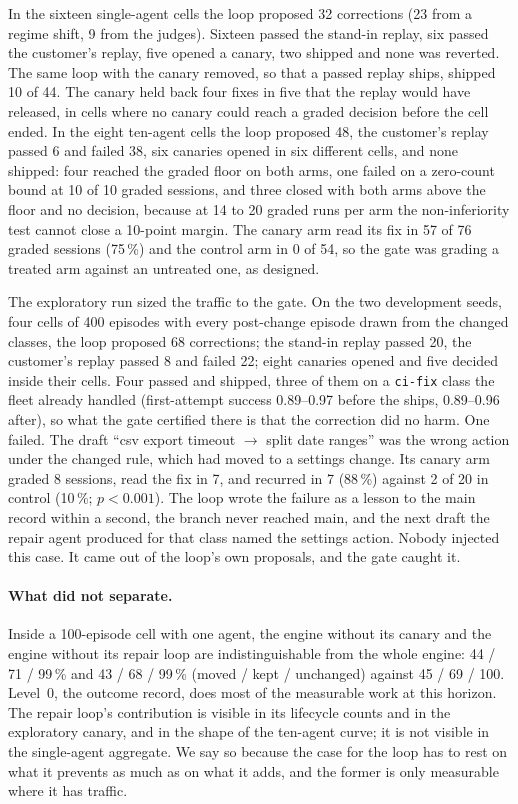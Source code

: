 \documentclass[11pt]{article}
\newcommand{\code}[1]{\texttt{#1}}
\begin{document}
In the sixteen single-agent cells the loop proposed 32 corrections (23 from a regime shift, 9
from the judges). Sixteen passed the stand-in replay, six passed the customer's replay, five
opened a canary, two shipped and none was reverted. The same loop with the canary removed, so
that a passed replay ships, shipped 10 of 44. The canary held back four fixes in five that the
replay would have released, in cells where no canary could reach a graded decision before the
cell ended. In the eight ten-agent cells the loop proposed 48, the customer's replay passed 6
and failed 38, six canaries opened in six different cells, and none shipped: four reached the
graded floor on both arms, one failed on a zero-count bound at 10 of 10 graded sessions, and
three closed with both arms above the floor and no decision, because at 14 to 20 graded runs per
arm the non-inferiority test cannot close a 10-point margin. The canary arm read its fix in 57 of
76 graded sessions (75\,\%) and the control arm in 0 of 54, so the gate was grading a treated
arm against an untreated one, as designed.

The exploratory run sized the traffic to the gate. On the two development seeds, four cells of
400 episodes with every post-change episode drawn from the changed classes, the loop proposed 68
corrections; the stand-in replay passed 20, the customer's replay passed 8 and failed 22; eight
canaries opened and five decided inside their cells. Four passed and shipped, three of them on a
\code{ci-fix} class the fleet already handled (first-attempt success 0.89--0.97 before the
ships, 0.89--0.96 after), so what the gate certified there is that the correction did no harm.
One failed. The draft ``csv export timeout $\to$ split date ranges'' was the wrong action under
the changed rule, which had moved to a settings change. Its canary arm graded 8 sessions, read
the fix in 7, and recurred in 7 (88\,\%) against 2 of 20 in control (10\,\%; $p < 0.001$). The
loop wrote the failure as a lesson to the main record within a second, the branch never reached
main, and the next draft the repair agent produced for that class named the settings action.
Nobody injected this case. It came out of the loop's own proposals, and the gate caught it.

\paragraph{What did not separate.} Inside a 100-episode cell with one agent, the engine without
its canary and the engine without its repair loop are indistinguishable from the whole engine:
44 / 71 / 99\,\% and 43 / 68 / 99\,\% (moved / kept / unchanged) against 45 / 69 / 100. Level~0,
the outcome record, does most of the measurable work at this horizon. The repair loop's
contribution is visible in its lifecycle counts and in the exploratory canary, and in the shape
of the ten-agent curve; it is not visible in the single-agent aggregate. We say so because the
case for the loop has to rest on what it prevents as much as on what it adds, and the former is
only measurable where it has traffic.
\end{document}

